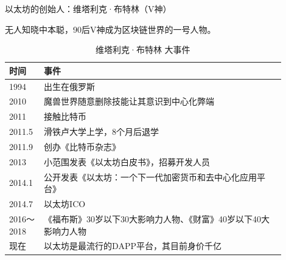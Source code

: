 \documentclass[11pt]{beamer}
\begin{document}
\begin{frame}{以太坊的创始人：维塔利克·布特林（V神）}

	{\footnotesize 无人知晓中本聪，90后V神成为区块链世界的一号人物。}
	\begin{minipage}[t]{0.7\linewidth}
		\begin{table}[]
			\footnotesize
			\begin{tabular}{@{}p{0.1\linewidth}p{0.8\linewidth}@{}}
				\toprule
				时间       & 事件                                                             \\ \midrule
				1994       & 出生在俄罗斯                                                     \\
				2010       & 魔兽世界随意删除技能让其意识到中心化弊端                         \\
				2011       & 接触比特币                                                       \\
				2011.5     & 滑铁卢大学上学，8个月后退学                                      \\
				2011.9     & 创办《比特币杂志》                                               \\
				2013       & 小范围发表《以太坊白皮书》，招募开发人员                         \\
				2014.1     & 公开发表《以太坊：一个下一代加密货币和去中心化应用平台》         \\
				2014.7     & 以太坊ICO                                                        \\
				2016～2018 & 《福布斯》30岁以下30大影响力人物、《财富》40岁以下40大影响力人物 \\
				现在       & 以太坊是最流行的DAPP平台，其目前身价千亿                         \\ \bottomrule
			\end{tabular}
			\caption{维塔利克·布特林 大事件}
		\end{table}
	\end{minipage}%
	\begin{minipage}[t]{0.3\linewidth}
		\begin{figure}
			\centering
\end{figure}
\end{minipage}
\end{frame}
\end{document}
